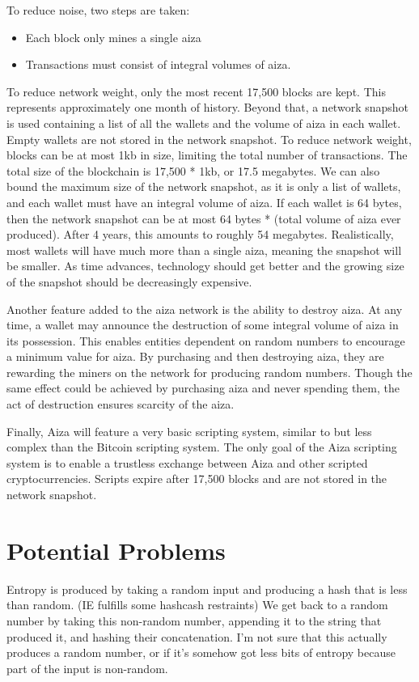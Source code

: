 \documentclass[twocolumn]{article}
\begin{document}
To reduce noise, two steps are taken:

\begin{itemize}
	\item Each block only mines a single aiza
	\item Transactions must consist of integral volumes of aiza.
\end{itemize}

To reduce network weight, only the most recent 17,500 blocks are kept.
This represents approximately one month of history.
Beyond that, a network snapshot is used containing a list of all the wallets and the volume of aiza in each wallet.
Empty wallets are not stored in the network snapshot.
To reduce network weight, blocks can be at most 1kb in size, limiting the total number of transactions.
The total size of the blockchain is 17,500 * 1kb, or 17.5 megabytes.
We can also bound the maximum size of the network snapshot, as it is only a list of wallets, and each wallet must have an integral volume of aiza.
If each wallet is 64 bytes, then the network snapshot can be at most 64 bytes * (total volume of aiza ever produced).
After 4 years, this amounts to roughly 54 megabytes.
Realistically, most wallets will have much more than a single aiza, meaning the snapshot will be smaller.
As time advances, technology should get better and the growing size of the snapshot should be decreasingly expensive.

Another feature added to the aiza network is the ability to destroy aiza.
At any time, a wallet may announce the destruction of some integral volume of aiza in its possession.
This enables entities dependent on random numbers to encourage a minimum value for aiza.
By purchasing and then destroying aiza, they are rewarding the miners on the network for producing random numbers.
Though the same effect could be achieved by purchasing aiza and never spending them, the act of destruction ensures scarcity of the aiza.

Finally, Aiza will feature a very basic scripting system, similar to but less complex than the Bitcoin scripting system.
The only goal of the Aiza scripting system is to enable a trustless exchange between Aiza and other scripted cryptocurrencies.
Scripts expire after 17,500 blocks and are not stored in the network snapshot.

\section{Potential Problems}
Entropy is produced by taking a random input and producing a hash that is less than random. (IE fulfills some hashcash restraints)
We get back to a random number by taking this non-random number, appending it to the string that produced it, and hashing their concatenation.
I'm not sure that this actually produces a random number, or if it's somehow got less bits of entropy because part of the input is non-random.
\end{document}
